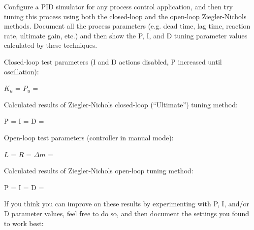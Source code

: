 

Configure a PID simulator for any process control application, and then try tuning this process using both the closed-loop and the open-loop Ziegler-Nichols methods.  Document all the process parameters (e.g. dead time, lag time, reaction rate, ultimate gain, etc.) and then show the P, I, and D tuning parameter values calculated by these techniques.

\vskip 30pt

\noindent
Closed-loop test parameters (I and D actions disabled, P increased until oscillation):

\vskip 10pt

$K_u$ = \underbar{\hskip 50pt} \hskip 50pt $P_u$ = \underbar{\hskip 50pt}

\vskip 10pt

\noindent
Calculated results of Ziegler-Nichols closed-loop (``Ultimate'') tuning method:

\vskip 10pt

P = \underbar{\hskip 50pt} \hskip 50pt I = \underbar{\hskip 50pt} \hskip 50pt D = \underbar{\hskip 50pt}



\vskip 50pt



\noindent
Open-loop test parameters (controller in manual mode):

\vskip 10pt

$L$ = \underbar{\hskip 50pt} \hskip 50pt $R$ = \underbar{\hskip 50pt} \hskip 50pt $\Delta m$ = \underbar{\hskip 50pt} 

\vskip 10pt

\noindent
Calculated results of Ziegler-Nichols open-loop tuning method:

\vskip 10pt

P = \underbar{\hskip 50pt} \hskip 50pt I = \underbar{\hskip 50pt} \hskip 50pt D = \underbar{\hskip 50pt}



\vskip 50pt



\noindent
If you think you can improve on these results by experimenting with P, I, and/or D parameter values, feel free to do so, and then document the settings you found to work best:

\vskip 10pt


